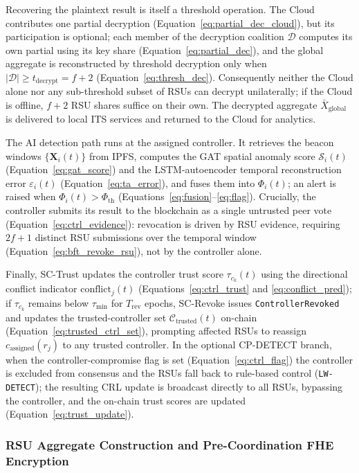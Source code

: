 \documentclass[12pt, a4paper]{report}
\begin{document}
Recovering the plaintext result is itself a threshold operation. The
Cloud contributes one partial decryption (Equation~\ref{eq:partial_dec_cloud}),
but its participation is optional; each member of the decryption coalition
$\mathcal{D}$ computes its own partial using its key share
(Equation~\ref{eq:partial_dec}), and the global aggregate is reconstructed
by threshold decryption only when $|\mathcal{D}| \ge t_{\text{decrypt}} = f{+}2$
(Equation~\ref{eq:thresh_dec}). Consequently neither the Cloud alone nor
any sub-threshold subset of RSUs can decrypt unilaterally; if the Cloud is
offline, $f{+}2$ RSU shares suffice on their own. The decrypted aggregate
$\bar{X}_{\text{global}}$ is delivered to local ITS services and returned
to the Cloud for analytics.

The AI detection path runs at the assigned controller. It retrieves the
beacon windows $\{\mathbf{X}_i(t)\}$ from IPFS, computes the GAT spatial
anomaly score $\mathcal{S}_i(t)$ (Equation~\ref{eq:gat_score}) and the
LSTM-autoencoder temporal reconstruction error $\varepsilon_i(t)$
(Equation~\ref{eq:ta_error}), and fuses them into $\Phi_i(t)$; an alert is
raised when $\Phi_i(t) > \Phi_{\text{th}}$
(Equations~\ref{eq:fusion}--\ref{eq:flag}). Crucially, the controller
submits its result to the blockchain as a single untrusted peer
vote (Equation~\ref{eq:ctrl_evidence}): revocation is driven by RSU
evidence, requiring $2f{+}1$ distinct RSU submissions over the temporal
window (Equation~\ref{eq:bft_revoke_rsu}), not by the controller alone.

Finally, SC-Trust updates the controller trust score $\tau_{c_k}(t)$ using
the directional conflict indicator $\text{conflict}_j(t)$
(Equations~\ref{eq:ctrl_trust} and \ref{eq:conflict_pred}); if
$\tau_{c_k}$ remains below $\tau_{\min}$ for $T_{\text{rev}}$ epochs,
SC-Revoke issues \texttt{ControllerRevoked} and updates the trusted-controller
set $\mathcal{C}_{\text{trusted}}(t)$ on-chain (Equation~\ref{eq:trusted_ctrl_set}),
prompting affected RSUs to reassign $c_{\text{assigned}}(r_j)$ to any trusted
controller. In the optional CP-DETECT branch, when the controller-compromise
flag is set (Equation~\ref{eq:ctrl_flag}) the controller is excluded from
consensus and the RSUs fall back to rule-based control (\texttt{LW-DETECT});
the resulting CRL update is broadcast directly to all RSUs, bypassing the
controller, and the on-chain trust scores are updated
(Equation~\ref{eq:trust_update}).

\subsubsection{RSU Aggregate Construction and Pre-Coordination FHE Encryption}
\end{document}
